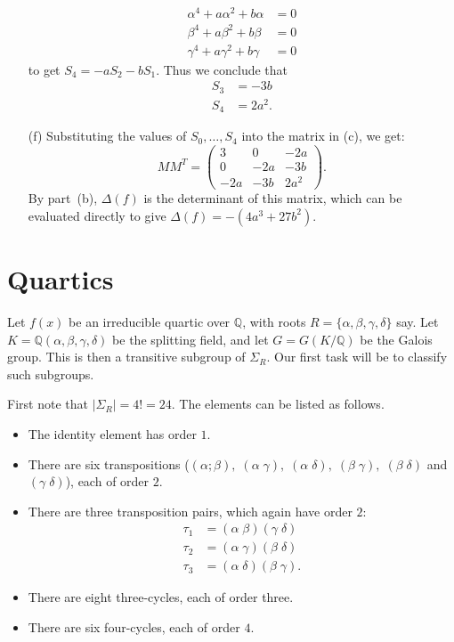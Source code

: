 \documentclass{amsart}
\newcommand{\Q}         {{\mathbb{Q}}}
\newcommand{\al}        {\alpha}
\newcommand{\bt}        {\beta}
\newcommand{\gm}        {\gamma}
\newcommand{\dl}        {\delta}
\newcommand{\Dl}        {\Delta}
\newcommand{\Sg}        {\Sigma}
\renewcommand{\:}{\colon}
\newenvironment{solution}{\SolutionInline}{\endSolutionInline}
\theoremstyle{definition}
\renewenvironment{solution}{\SolutionAtEnd}{\endSolutionAtEnd}
\begin{document}
\begin{solution}
\begin{itemize}
   \begin{align*}
    \al^4+a\al^2+b\al &= 0 \\
    \bt^4+a\bt^2+b\bt &= 0 \\
    \gm^4+a\gm^2+b\gm &= 0
   \end{align*}
   to get $S_4=-aS_2-bS_1$. Thus we conclude that
   \begin{align*}
     S_3 &= -3b\\
     S_4 &= 2a^2.
   \end{align*}
  \item[(f)] Substituting the values of $S_0,\ldots,S_4$ into the
   matrix in (c), we get:
   \[ MM^T =
      \begin{pmatrix}
       3   & 0   & -2a  \\
       0   & -2a & -3b  \\
       -2a & -3b & 2a^2
      \end{pmatrix}.
   \]
   By part~(b), $\Dl(f)$ is the determinant of this matrix, which can
   be evaluated directly to give $\Dl(f)=-(4a^3+27b^2)$.
 \end{itemize}
\end{solution}


\section{Quartics}
\label{sec-quartics}

Let $f(x)$ be an irreducible quartic over $\Q$, with roots
$R=\{\al,\bt,\gm,\dl\}$ say.  Let $K=\Q(\al,\bt,\gm,\dl)$ be the
splitting field, and let $G=G(K/\Q)$ be the Galois group.  This is
then a transitive subgroup of $\Sg_R$.  Our first task will be to
classify such subgroups.

First note that $|\Sg_R|=4!=24$.  The elements can be listed as
follows. 
\begin{itemize}
 \item The identity element has order $1$.
 \item There are six transpositions
  ($(\al;\bt),\;(\al\;\gm),\;(\al\;\dl),\;(\bt\;\gm),\;(\bt\;\dl)$ and
  $(\gm\;\dl)$), each of order $2$.
 \item There are three transposition pairs, which again have order
  $2$:
  \begin{align*}
   \tau_1 &= (\al\;\bt)(\gm\;\dl) \\
   \tau_2 &= (\al\;\gm)(\bt\;\dl) \\
   \tau_3 &= (\al\;\dl)(\bt\;\gm).
  \end{align*}
 \item There are eight three-cycles, each of order three.
 \item There are six four-cycles, each of order $4$.
\end{itemize}
\end{document}
